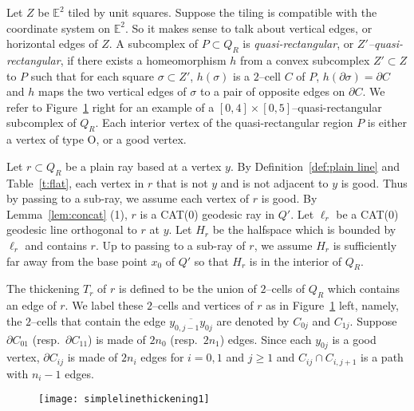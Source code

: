 \documentclass[11pt]{amsart}
\theoremstyle{definition}
\begin{document}
Let $Z$ be $\mathbb E^2$ tiled by unit squares. Suppose the tiling is compatible with the coordinate system on $\mathbb E^2$. So it makes sense to talk about vertical edges, or horizontal edges of $Z$. A subcomplex of $P\subset Q_R$ is \emph{quasi-rectangular}, or \emph{$Z'$--quasi-rectangular}, if there exists a homeomorphism $h$ from a convex subcomplex $Z'\subset Z$ to $P$ such that for each square $\sigma\subset Z'$, $h(\sigma)$ is a $2$--cell $C$ of $P$, $h(\partial\sigma)=\partial C$ and $h$ maps the two vertical edges of $\sigma$ to a pair of opposite edges on $\partial C$. We refer to Figure~\ref{f:simplelinethickening1} right for an example of a $[0,4]\times[0,5]$--quasi-rectangular subcomplex of $Q_R$. Each interior vertex of the quasi-rectangular region $P$ is either a vertex of type O, or a good vertex. 


Let $r\subset Q_R$ be a plain ray based at a vertex $y$. By Definition~\ref{def:plain line} and Table~\ref{t:flat}, each vertex in $r$ that is not $y$ and is not adjacent to $y$ is good. Thus by passing to a sub-ray, we assume each vertex of $r$ is good. By Lemma~\ref{lem:concat} (1), $r$ is a CAT(0) geodesic ray in $Q'$. Let $\ell_r$ be a CAT(0) geodesic line orthogonal to $r$ at $y$. Let $H_r$ be the halfspace which is bounded by $\ell_r$ and contains $r$. Up to passing to a sub-ray of $r$, we assume $H_r$ is sufficiently far away from the base point $x_0$ of $Q'$ so that $H_r$ is in the interior of $Q_R$.

The thickening $T_r$ of $r$ is defined to be the union of $2$--cells of $Q_R$ which contains an edge of $r$. We label these $2$--cells and vertices of $r$ as in Figure~\ref{f:simplelinethickening1} left, namely, the $2$--cells that contain the edge $\overline{y_{0,j-1}y_{0j}}$ are denoted by $C_{0j}$ and $C_{1j}$. Suppose $\partial C_{01}$ (resp.\ $\partial C_{11}$) is made of $2n_0$ (resp.\ $2n_1$) edges. Since each $y_{0j}$ is a good vertex, $\partial C_{ij}$ is made of $2n_i$ edges for $i=0,1$ and $j\ge 1$ and $C_{ij}\cap C_{i,j+1}$ is a path with $n_i-1$ edges.
\begin{figure}[h!]
	\centering
	\texttt{[image: simplelinethickening1]}
	\caption{}
	\label{f:simplelinethickening1}
\end{figure}
\end{document}
